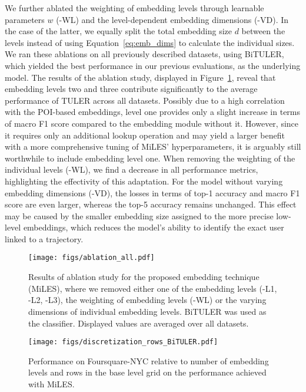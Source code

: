 \documentclass{article} %
\theoremstyle{definition}
\begin{document}
We further ablated the weighting of embedding levels through learnable parameters $w$ (-WL) and the level-dependent embedding dimensions (-VD).
In the case of the latter, we equally split the total embedding size $d$ between the levels instead of using Equation~\ref{eq:emb_dims} to calculate the individual sizes.
We ran these ablations on all previously described datasets, using BiTULER, which yielded the best performance in our previous evaluations, as the underlying model.
The results of the ablation study, displayed in Figure~\ref{fig:ablation}, reveal that embedding levels two and three contribute significantly to the average performance of TULER across all datasets.
Possibly due to a high correlation with the POI-based embeddings, level one provides only a slight increase in terms of macro F1 score compared to the embedding module without it.
However, since it requires only an additional lookup operation and may yield a larger benefit with a more comprehensive tuning of MiLES' hyperparameters, it is arguably still worthwhile to include embedding level one.
When removing the weighting of the individual levels (-WL), we find a decrease in all performance metrics, highlighting the effectivity of this adaptation.
For the model without varying embedding dimensions (-VD), the losses in terms of top-1 accuracy and macro F1 score are even larger, whereas the top-5 accuracy remains unchanged.
This effect may be caused by the smaller embedding size assigned to the more precise low-level embeddings, which reduces the model's ability to identify the exact user linked to a trajectory.
\begin{figure}[h]
    \centering
    \texttt{[image: figs/ablation\_all.pdf]}
    \caption{Results of ablation study for the proposed embedding technique (MiLES), where we removed either one of the embedding levels (-L1, -L2, -L3), the weighting of embedding levels (-WL) or the varying dimensions of individual embedding levels. BiTULER was used as the classifier. Displayed values are averaged over all datasets.}
    \label{fig:ablation}
\end{figure}

\begin{figure}[h]
    \centering
    \texttt{[image: figs/discretization\_rows\_BiTULER.pdf]}
    \caption{Performance on Foursquare-NYC relative to number of embedding levels and rows in the base level grid on the performance achieved with MiLES.}
    \label{fig:discretization}
\end{figure}
\end{document}
